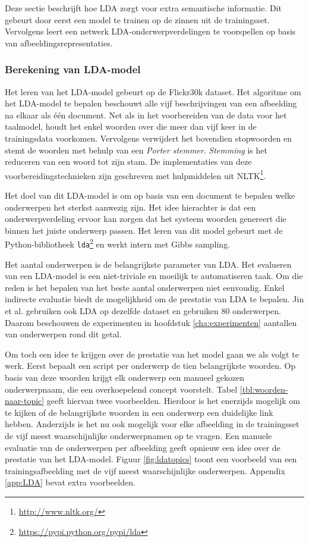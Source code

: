 Deze sectie beschrijft hoe LDA zorgt voor extra semantische informatie. Dit gebeurt door eerst een model te trainen op de zinnen uit de trainingsset. Vervolgens leert een netwerk LDA-onderwerpverdelingen te voorspellen op basis van afbeeldingsrepresentaties.

\subsubsection{Berekening van LDA-model}
\label{subs:Berekening van onderwerpverdeling}
Het leren van het LDA-model gebeurt op de Flickr30k dataset. Het algoritme om het LDA-model te bepalen beschouwt alle vijf beschrijvingen van een afbeelding na elkaar als \'e\'en document. Net als in het voorbereiden van de data voor het taalmodel, houdt het enkel woorden over die meer dan vijf keer in de trainingsdata voorkomen. Vervolgens verwijdert het bovendien stopwoorden en stemt de woorden met behulp van een \emph{Porter stemmer}. \emph{Stemming} is het reduceren van een woord tot zijn stam. De implementaties van deze voorbereidingstechnieken zijn geschreven met hulpmiddelen uit NLTK\footnote{\url{http://www.nltk.org/}}.

Het doel van dit LDA-model is om op basis van een document te bepalen welke onderwerpen het sterkst aanwezig zijn. Het idee hierachter is dat een onderwerpverdeling ervoor kan zorgen dat het systeem woorden genereert die binnen het juiste onderwerp passen. Het leren van dit model gebeurt met de Python-bibliotheek \texttt{lda}\footnote{\url{https://pypi.python.org/pypi/lda}} en werkt intern met Gibbs sampling.

Het aantal onderwerpen is de belangrijkste parameter van LDA. Het evalueren van een LDA-model is een niet-triviale en moeilijk te automatiseren taak. Om die reden is het bepalen van het beste aantal onderwerpen niet eenvoudig. Enkel indirecte evaluatie biedt de mogelijkheid om de prestatie van LDA te bepalen. Jin et al.\cite{Jin2015} gebruiken ook LDA op dezelfde dataset en gebruiken 80 onderwerpen. Daarom beschouwen de experimenten in hoofdstuk \ref{cha:experimenten} aantallen van onderwerpen rond dit getal. 

Om toch een idee te krijgen over de prestatie van het model gaan we als volgt te werk. Eerst bepaalt een script per onderwerp de tien belangrijkste woorden. Op basis van deze woorden krijgt elk onderwerp een manueel gekozen onderwerpnaam, die een overkoepelend concept voorstelt. Tabel \ref{tbl:woorden-naar-topic} geeft hiervan twee voorbeelden. 
Hierdoor is het enerzijds mogelijk om te kijken of de belangrijkste woorden in een onderwerp een duidelijke link hebben. Anderzijds is het nu ook mogelijk voor elke afbeelding in de trainingsset de vijf meest waarschijnlijke onderwerpnamen op te vragen. Een manuele evaluatie van de onderwerpen per afbeelding geeft opnieuw een idee over de prestatie van het LDA-model. Figuur \ref{fig:ldatopics} toont een voorbeeld van een trainingsafbeelding met de vijf meest waarschijnlijke onderwerpen. Appendix \ref{app:LDA} bevat extra voorbeelden.

